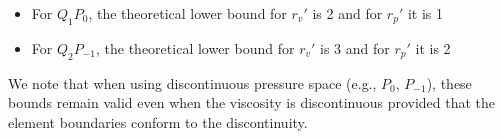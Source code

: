 \begin{itemize}
\item For $Q_1P_0$, the theoretical lower bound for $r_v'$ is 2 and for $r_p'$ it is 1
\item For $Q_2P_{-1}$, the theoretical lower bound for $r_v'$ is 3 and for $r_p'$ it is 2
\end{itemize}

We note that when using discontinuous pressure space
(e.g., $P_0$, $P_{-1}$), these bounds remain valid even
when the viscosity is discontinuous provided that the element boundaries conform to the discontinuity.

